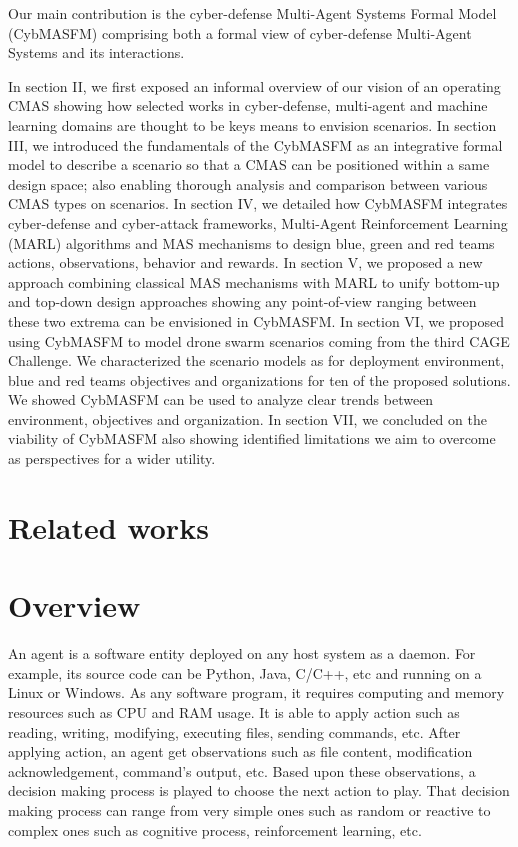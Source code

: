 \documentclass[conference]{IEEEtran}
\begin{document}
Our main contribution is the cyber-defense Multi-Agent Systems Formal Model (CybMASFM) comprising both a formal view of cyber-defense Multi-Agent Systems and its interactions.

In section II, we first exposed an informal overview of our vision of an operating CMAS showing how selected works in cyber-defense, multi-agent and machine learning domains are thought to be keys means to envision scenarios.
In section III, we introduced the fundamentals of the CybMASFM as an integrative formal model to describe a scenario so that a CMAS can be positioned within a same design space; also enabling thorough analysis and comparison between various CMAS types on scenarios.
In section IV, we detailed how CybMASFM integrates cyber-defense and cyber-attack frameworks, Multi-Agent Reinforcement Learning (MARL) algorithms and MAS mechanisms to design blue, green and red teams actions, observations, behavior and rewards.
In section V, we proposed a new approach combining classical MAS mechanisms with MARL to unify bottom-up and top-down design approaches showing any point-of-view ranging between these two extrema can be envisioned in CybMASFM.
In section VI, we proposed using CybMASFM to model drone swarm scenarios coming from the third CAGE Challenge. We characterized the scenario models as for deployment environment, blue and red teams objectives and organizations for ten of the proposed solutions. We showed CybMASFM can be used to analyze clear trends between environment, objectives and organization.
In section VII, we concluded on the viability of CybMASFM also showing identified limitations we aim to overcome as perspectives for a wider utility.

\section{Related works}

\section{Overview}

An agent is a software entity deployed on any host system as a daemon.
For example, its source code can be Python, Java, C/C++, etc and running on a Linux or Windows.
As any software program, it requires computing and memory resources such as CPU and RAM usage.
It is able to apply action such as reading, writing, modifying, executing files, sending commands, etc.
After applying action, an agent get observations such as file content, modification acknowledgement, command's output, etc.
Based upon these observations, a decision making process is played to choose the next action to play. That decision making process can range from very simple ones such as random or reactive to complex ones such as cognitive process, reinforcement learning, etc.
\end{document}
